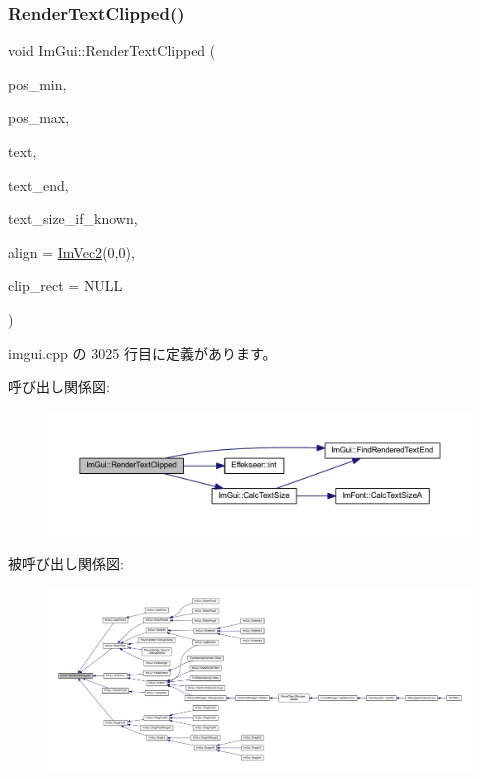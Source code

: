 \subsubsection{\texorpdfstring{Render\+Text\+Clipped()}{RenderTextClipped()}}
{\footnotesize\ttfamily void Im\+Gui\+::\+Render\+Text\+Clipped (\begin{DoxyParamCaption}\item[{const \mbox{\hyperlink{struct_im_vec2}{Im\+Vec2}} \&}]{pos\+\_\+min,  }\item[{const \mbox{\hyperlink{struct_im_vec2}{Im\+Vec2}} \&}]{pos\+\_\+max,  }\item[{const char $\ast$}]{text,  }\item[{const char $\ast$}]{text\+\_\+end,  }\item[{const \mbox{\hyperlink{struct_im_vec2}{Im\+Vec2}} $\ast$}]{text\+\_\+size\+\_\+if\+\_\+known,  }\item[{const \mbox{\hyperlink{struct_im_vec2}{Im\+Vec2}} \&}]{align = {\ttfamily \mbox{\hyperlink{struct_im_vec2}{Im\+Vec2}}(0,0)},  }\item[{const \mbox{\hyperlink{struct_im_rect}{Im\+Rect}} $\ast$}]{clip\+\_\+rect = {\ttfamily NULL} }\end{DoxyParamCaption})}



 imgui.\+cpp の 3025 行目に定義があります。

呼び出し関係図\+:\nopagebreak
\begin{figure}[H]
\begin{center}
\leavevmode
\includegraphics[width=350pt]{namespace_im_gui_ab362eafae794c7364a6b96ea06f38eb9_cgraph}
\end{center}
\end{figure}
被呼び出し関係図\+:
\nopagebreak
\begin{figure}[H]
\begin{center}
\leavevmode
\includegraphics[width=350pt]{namespace_im_gui_ab362eafae794c7364a6b96ea06f38eb9_icgraph}
\end{center}
\end{figure}
\mbox{\label{namespace_im_gui_aa483b40f6899e1b289b4bf6c2673d1d2}} 
